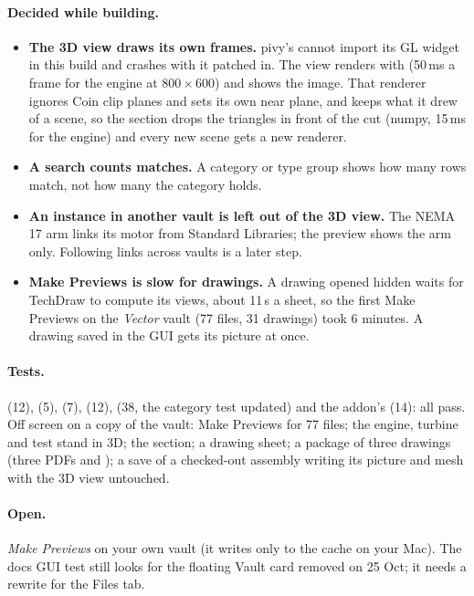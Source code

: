 \paragraph{Decided while building.}
\begin{itemize}[nosep]
  \item \textbf{The 3D view draws its own frames.} pivy's  cannot import its GL widget in this
        build and crashes with it patched in. The view renders with  (50\,ms a frame for
        the engine at 800\,$\times$\,600) and shows the image. That renderer ignores Coin clip planes and sets its own
        near plane, and keeps what it drew of a scene, so the section drops the triangles in front of the cut
        (numpy, 15\,ms for the engine) and every new scene gets a new renderer.
  \item \textbf{A search counts matches.} A category or type group shows how many rows match, not how many the
        category holds.
  \item \textbf{An instance in another vault is left out of the 3D view.} The NEMA 17 arm links its motor from
        Standard Libraries; the preview shows the arm only. Following links across vaults is a later step.
  \item \textbf{Make Previews is slow for drawings.} A drawing opened hidden waits for TechDraw to compute its views,
        about 11\,s a sheet, so the first Make Previews on the \emph{Vector} vault (77 files, 31 drawings) took
        6 minutes. A drawing saved in the GUI gets its picture at once.
\end{itemize}

\paragraph{Tests.}  (12),  (5),
 (7),  (12), 
(38, the category test updated) and the addon's  (14): all pass. Off screen on a
copy of the vault: Make Previews for 77 files; the engine, turbine and test stand in 3D; the section; a drawing
sheet; a package of three drawings (three PDFs and ); a save of a checked-out assembly writing its
picture and mesh with the 3D view untouched.

\paragraph{Open.} \emph{Make Previews} on your own vault (it writes only to the cache on your Mac). The docs GUI test
 still looks for the floating Vault card removed on 25 Oct; it needs a rewrite for the
Files tab.
